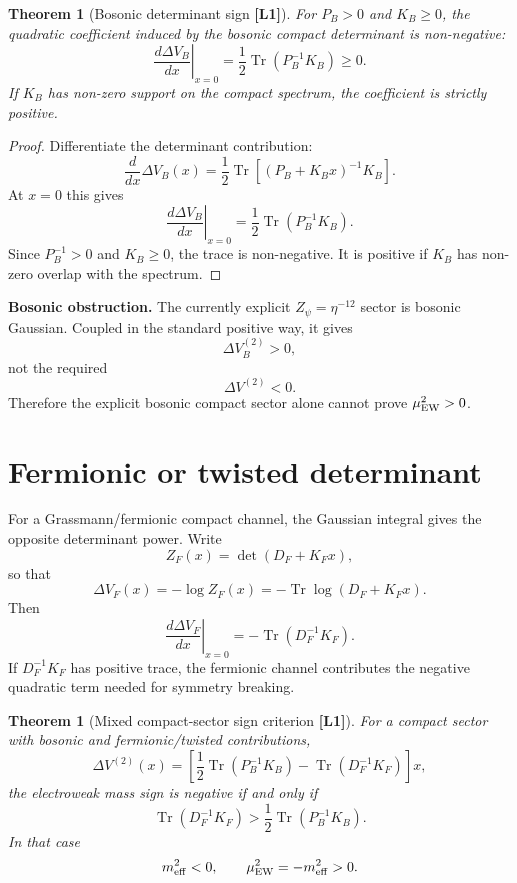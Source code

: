 \documentclass[12pt,a4paper]{article}
\newtheorem{theorem}[definition]{Theorem}
\newcommand{\Lone}{\textbf{[L1]}}
\begin{document}
\begin{theorem}[Bosonic determinant sign \Lone]
For $P_B>0$ and $K_B\ge0$, the quadratic coefficient induced by the bosonic
compact determinant is non-negative:
\[
  \left.\frac{d\Delta V_B}{dx}\right|_{x=0}
  =
  \frac12\operatorname{Tr}(P_B^{-1}K_B)
  \ge0.
\]
If $K_B$ has non-zero support on the compact spectrum, the coefficient is
strictly positive.
\end{theorem}

\begin{proof}
Differentiate the determinant contribution:
\[
  \frac{d}{dx}\Delta V_B(x)
  =
  \frac12\operatorname{Tr}\!\left[(P_B+K_Bx)^{-1}K_B\right].
\]
At $x=0$ this gives
\[
  \left.\frac{d\Delta V_B}{dx}\right|_{x=0}
  =
  \frac12\operatorname{Tr}(P_B^{-1}K_B).
\]
Since $P_B^{-1}>0$ and $K_B\ge0$, the trace is non-negative.  It is positive if
$K_B$ has non-zero overlap with the spectrum.
\end{proof}

\begin{obstructionbox}
\textbf{Bosonic obstruction.} The currently explicit $Z_\psi=\eta^{-12}$ sector
is bosonic Gaussian.  Coupled in the standard positive way, it gives
\[
  \Delta V_B^{(2)}>0,
\]
not the required
\[
  \Delta V^{(2)}<0.
\]
Therefore the explicit bosonic compact sector alone cannot prove
$\mu_{\rm EW}^2>0$.
\end{obstructionbox}

\section{Fermionic or twisted determinant}

For a Grassmann/fermionic compact channel, the Gaussian integral gives the
opposite determinant power.  Write
\[
  Z_F(x)=\det(D_F+K_Fx),
\]
so that
\[
  \Delta V_F(x)=-\log Z_F(x)
  =-\operatorname{Tr}\log(D_F+K_Fx).
\]
Then
\[
  \left.\frac{d\Delta V_F}{dx}\right|_{x=0}
  =
  -\operatorname{Tr}(D_F^{-1}K_F).
\]
If $D_F^{-1}K_F$ has positive trace, the fermionic channel contributes the
negative quadratic term needed for symmetry breaking.

\begin{theorem}[Mixed compact-sector sign criterion \Lone]
For a compact sector with bosonic and fermionic/twisted contributions,
\[
  \Delta V^{(2)}(x)
  =
  \left[
    \frac12\operatorname{Tr}(P_B^{-1}K_B)
    -
    \operatorname{Tr}(D_F^{-1}K_F)
  \right]x,
\]
the electroweak mass sign is negative if and only if
\[
  \operatorname{Tr}(D_F^{-1}K_F)
  >
  \frac12\operatorname{Tr}(P_B^{-1}K_B).
\]
In that case
\[
  m_{\rm eff}^2<0,
  \qquad
  \mu_{\rm EW}^2=-m_{\rm eff}^2>0.
\]
\end{theorem}
\end{document}
